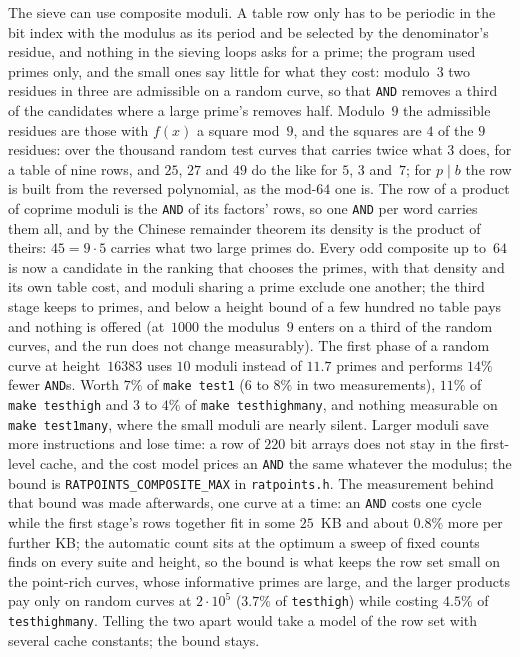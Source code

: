 \documentclass[12pt,a4paper,oneside]{amsart}
\begin{document}
The sieve can use composite moduli. A table row only has to be periodic in
the bit index with the modulus as its period and be selected by the
denominator's residue, and nothing in the sieving loops asks for a prime;
the program used primes only, and the small ones say little for what they
cost: modulo~$3$ two residues in three are admissible on a random curve, so
that \texttt{AND} removes a third of the candidates where a large prime's
removes half. Modulo~$9$ the admissible residues are those with $f(x)$ a
square mod~$9$, and the squares are $4$ of the $9$ residues: over the
thousand random test curves that carries twice what $3$ does, for a table
of nine rows, and $25$, $27$ and $49$ do the like for $5$, $3$ and~$7$; for
$p \mid b$ the row is built from the reversed polynomial, as the mod-$64$
one is. The row of a product of coprime moduli is the \texttt{AND} of its
factors' rows, so one \texttt{AND} per word carries them all, and by the
Chinese remainder theorem its density is the product of theirs: $45 = 9
\cdot 5$ carries what two large primes do. Every odd composite up to~$64$
is now a candidate in the ranking that chooses the primes, with that
density and its own table cost, and moduli sharing a prime exclude one
another; the third stage keeps to primes, and below a height bound of a
few hundred no table pays and nothing is offered (at~$1000$ the modulus~$9$
enters on a third of the random curves, and the run does not change
measurably). The first phase of a random curve at height~$16383$ uses $10$
moduli instead of $11.7$ primes and performs $14\%$ fewer \texttt{AND}s.
Worth $7\%$ of \texttt{make test1} ($6$ to $8\%$ in two measurements),
$11\%$ of \texttt{make testhigh} and $3$ to $4\%$ of \texttt{make
testhighmany}, and nothing measurable on \texttt{make test1many}, where the
small moduli are nearly silent. Larger moduli save more instructions and
lose time: a row
of $220$ bit arrays does not stay in the first-level cache, and the cost
model prices an \texttt{AND} the same whatever the modulus; the bound is
\texttt{RATPOINTS\_COMPOSITE\_MAX} in \texttt{ratpoints.h}. The measurement
behind that bound was made afterwards, one curve at a time: an \texttt{AND}
costs one cycle while the first stage's rows together fit in some $25$~KB and
about $0.8\%$ more per further KB; the automatic count sits at the optimum a
sweep of fixed counts finds on every suite and height, so the bound is what
keeps the row set small on the point-rich curves, whose informative primes
are large, and the larger products pay only on random curves at
$2\cdot 10^5$ ($3.7\%$ of \texttt{testhigh}) while costing $4.5\%$ of
\texttt{testhighmany}. Telling the two apart would take a model of the row
set with several cache constants; the bound stays.
\end{document}
